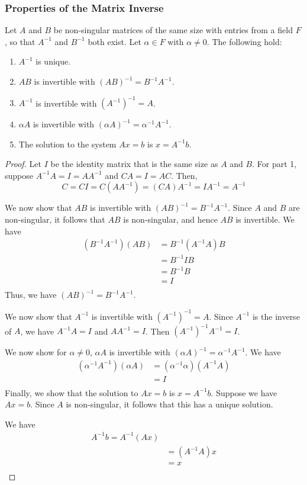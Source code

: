 \documentclass{article}
\begin{document}
\subsubsection{Properties of the Matrix Inverse}
\begin{theorem}
  Let $A$ and $B$ be non-singular matrices of the same size with entries from a field $F$, so that $A^{-1}$ and $B^{-1}$ both exist. Let $\alpha \in F$ with $\alpha \not = 0$. The following hold:
  \begin{enumerate}
    \item $A^{-1}$ is unique.
    \item $AB$ is invertible with $(AB)^{-1} = B^{-1}A^{-1}$.
    \item $A^{-1}$ is invertible with $(A^{-1})^{-1} = A$.
    \item $\alpha A$ is invertible with $(\alpha A)^{-1} = \alpha^{-1} A^{-1}$.
    \item The solution to the system $Ax = b$ is $x = A^{-1}b$.
  \end{enumerate}
\end{theorem}
\begin{proof}
  Let $I$ be the identity matrix that is the same size as $A$ and $B$. For part 1, suppose $A^{-1}A = I = AA^{-1}$ and $CA = I = AC$. Then,
  \[
    C = CI = C(AA^{-1}) = (CA)A^{-1} = IA^{-1} = A^{-1}
  \]

  We now show that $AB$ is invertible with $(AB)^{-1} = B^{-1}A^{-1}$. Since $A$ and $B$ are non-singular, it follows that $AB$ is non-singular, and hence $AB$ is invertible. We have
  \begin{align*}
    (B^{-1}A^{-1})(AB) &= B^{-1}(A^{-1}A)B\\
    &= B^{-1}IB\\
    &=B^{-1}B\\
    &= I\\
  \end{align*}
  Thus, we have $(AB)^{-1} = B^{-1}A^{-1}$.

  We now show that $A^{-1}$ is invertible with $(A^{-1})^{-1} = A$. Since $A^{-1}$ is the inverse of $A$, we have $A^{-1}A = I$ and $AA^{-1} = I$. Then $(A^{-1})^{-1}A^{-1} = I$.

  We now show for $\alpha \not = 0$, $\alpha A$ is invertible with $(\alpha A)^{-1} = \alpha^{-1}A^{-1}$.
  We have
  \begin{align*}
    (\alpha^{-1}A^{-1})(\alpha A) &= (\alpha^{-1}\alpha)(A^{-1}A)\\
    &= I\\
  \end{align*}
  Finally, we show that the solution to $Ax = b$ is $x = A^{-1}b$. Suppose we have $Ax = b$. Since $A$ is non-singular, it follows that this has a unique solution.

  We have
  \begin{align*}
    A^{-1}b = A^{-1}(Ax)\\
    &= (A^{-1}A)x\\
    &= x\\
  \end{align*}
\end{proof}
\end{document}
